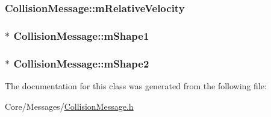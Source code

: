 \subsubsection[{\texorpdfstring{m\+Relative\+Velocity}{mRelativeVelocity}}]{ Collision\+Message\+::m\+Relative\+Velocity\hspace{0.3cm}{\ttfamily [private]}}\hypertarget{classCollisionMessage_a382a90fbeb1efa6b78c040b6f6eead27}{}\label{classCollisionMessage_a382a90fbeb1efa6b78c040b6f6eead27}
\subsubsection[{\texorpdfstring{m\+Shape1}{mShape1}}]{$\ast$ Collision\+Message\+::m\+Shape1\hspace{0.3cm}{\ttfamily [private]}}\hypertarget{classCollisionMessage_ab5cd196f62b1e8931e02190f1548965a}{}\label{classCollisionMessage_ab5cd196f62b1e8931e02190f1548965a}
\subsubsection[{\texorpdfstring{m\+Shape2}{mShape2}}]{$\ast$ Collision\+Message\+::m\+Shape2\hspace{0.3cm}{\ttfamily [private]}}\hypertarget{classCollisionMessage_add423f7b16d07fe364a5bb0198276264}{}\label{classCollisionMessage_add423f7b16d07fe364a5bb0198276264}


The documentation for this class was generated from the following file\+:\begin{DoxyCompactItemize}
\item 
Core/\+Messages/\hyperlink{CollisionMessage_8h}{Collision\+Message.\+h}\end{DoxyCompactItemize}

